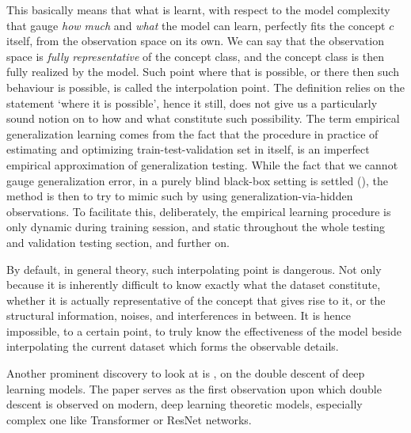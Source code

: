 \documentclass[10pt]{article} %
\begin{document}
This basically means that what is learnt, with respect to the model complexity that gauge \textit{how much} and \textit{what} the model can learn, perfectly fits the concept $c$ itself, from the observation space on its own. We can say that the observation space is \textit{fully representative} of the concept class, and the concept class is then fully realized by the model. Such point where that is possible, or there then such behaviour is possible, is called the interpolation point. The definition relies on the statement `where it is possible', hence it still, does not give us a particularly sound notion on to how and what constitute such possibility. The term empirical generalization learning comes from the fact that the procedure in practice of estimating and optimizing train-test-validation set in itself, is an imperfect empirical approximation of generalization testing. While the fact that we cannot gauge generalization error, in a purely blind black-box setting is settled (\cite{10.5555/2371238,10.5555/2930837,10.5555/2621980}), the method is then to try to mimic such by using generalization-via-hidden observations. To facilitate this, deliberately, the empirical learning procedure is only dynamic during training session, and static throughout the whole testing and validation testing section, and further on. 

By default, in general theory, such interpolating point is dangerous. Not only because it is inherently difficult to know exactly what the dataset constitute, whether it is actually representative of the concept that gives rise to it, or the structural information, noises, and interferences in between. It is hence impossible, to a certain point, to truly know the effectiveness of the model beside interpolating the current dataset which forms the observable details. 

Another prominent discovery to look at is \cite{nakkiran_deep_2019}, on the double descent of deep learning models. The paper serves as the first observation upon which double descent is observed on modern, deep learning theoretic models, especially complex one like Transformer or ResNet networks. 
\end{document}
